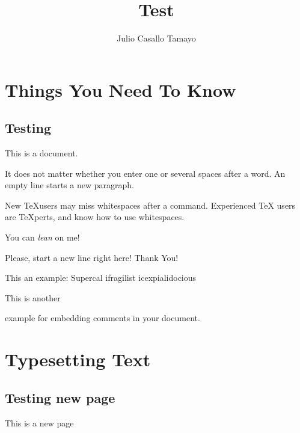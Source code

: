 \documentclass[a4paper,11pt]{report}
\title{Test}
\author{Julio Casallo Tamayo}
\begin{document}
  \maketitle

  \tableofcontents

  \chapter{Things You Need To Know}

  \section{Testing}
  This is a document.

  It does not matter whether you enter one or   several    
  spaces after a word.
  An empty line starts a new paragraph.

  New \TeX users may miss whitespaces after a command.
  Experienced \TeX{} users are \TeX perts, and know how to
  use whitespaces. %

  You can \textsl{lean} on me!

  Please, start a new line right here! \newline 
  Thank You!

  This an %
  example: Supercal%
              ifragilist%
        icexpialidocious

  This is another \begin{comment}
    rather stupid, 
    but helpful
  \end{comment}
  example for embedding comments in your document.

  

  \chapter{Typesetting Text}

  \newpage

  \section{Testing new page}
  This is a new page
\end{document}
